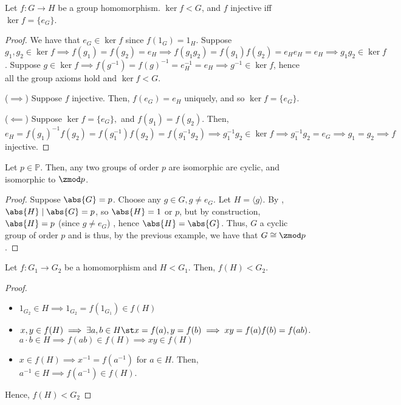 \documentclass[12pt,oneside]{article}
\begin{document}
\begin{lemma}
  Let $f: G \to H$ be a group homomorphism. $\ker f < G$, and $f$ injective iff $\ker f = \{e_G\}$.
\end{lemma}

\begin{proof}
  We have that $e_G \in \ker f$ since $f(1_{G}) = 1_H$. Suppose $g_1, g_2 \in \ker f \implies f(g_1) = f(g_2) = e_H \implies f(g_1 g_2) = f(g_1) f(g_2) = e_H e_H = e_H \implies g_1 g_2 \in \ker f$. Suppose $g \in \ker f \implies f(g^{-1}) = f(g)^{-1} = e_H^{-1} = e_H \implies g^{-1} \in \ker f$, hence all the group axioms hold and $\ker f < G$.


  \noindent($\implies$) Suppose $f$ injective. Then, $f(e_G) = e_H$ uniquely, and so $\ker f = \{e_G\}$. 
  
  \noindent($\impliedby$) Suppose $\ker f = \{e_G\},$ and $f(g_1) = f(g_2)$. Then, $e_H = f(g_1)^{-1}f(g_2) = f(g_1^{-1})f(g_2) = f(g_1^{-1}g_2) \implies g_1^{-1}g_2 \in \ker f \implies g_1^{-1}g_2 = e_G \implies g_1 = g_2 \implies f$ injective.
\end{proof}

\begin{corollary}
  Let $p \in \mathbb{P}$. Then, any two groups of order $p$ are isomorphic are cyclic, and isomorphic to $\zmod p$.
\end{corollary}

\begin{proof}
  Suppose $\abs{G} = p$. Choose any $g \in G, g \neq e_G$. Let $H = \langle g\rangle$. By , $\abs{H} \mid \abs{G} = p$, so $\abs{H} = 1$ or $p$, but by construction, $\abs{H} = p$ (since $g \neq e_G$) , hence $\abs{H} = \abs{G}$. Thus, $G$ a cyclic group of order $p$ and is thus, by the previous example, we have that $G \cong \zmod p$.
\end{proof}

\begin{proposition}
  Let $f : G_1 \to G_2$ be a homomorphism and $H < G_1$. Then, $f(H) < G_2$.
\end{proposition}

\begin{proof}
  \begin{itemize}
    \item $1_{G_2} \in H \implies 1_{G_2} = f(1_{G_1}) \in f(H)$
    \item $x,y \in f(H) \implies \exists a, b \in H \st x = f(a), y = f(b) \implies xy = f(a)f(b) = f(ab)$. $a\cdot b \in H \implies f(ab) \in f(H) \implies xy \in f(H)$
    \item $x \in f(H) \implies x^{-1} = f(a^{-1})$ for $a \in H$. Then, $a^{-1} \in H \implies f(a^{-1}) \in f(H)$.
  \end{itemize}
  Hence, $f(H) < G_2$
\end{proof}
\end{document}
